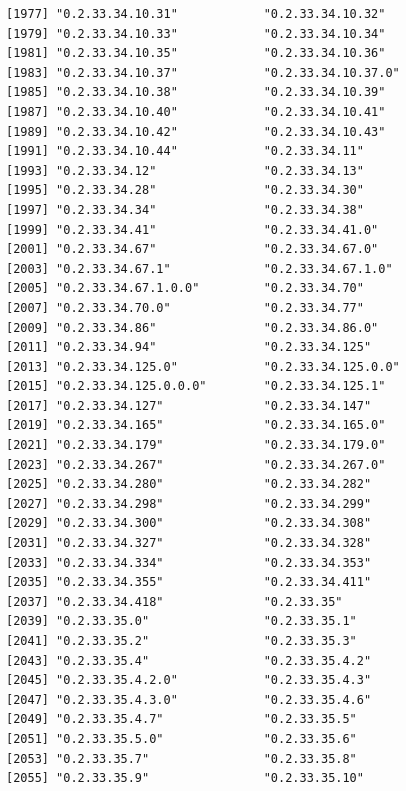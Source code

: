 \documentclass[
  letterpaper,
  DIV=11,
  numbers=noendperiod]{scrreprt}
\begin{document}
\begin{verbatim}
[1977] "0.2.33.34.10.31"            "0.2.33.34.10.32"           
[1979] "0.2.33.34.10.33"            "0.2.33.34.10.34"           
[1981] "0.2.33.34.10.35"            "0.2.33.34.10.36"           
[1983] "0.2.33.34.10.37"            "0.2.33.34.10.37.0"         
[1985] "0.2.33.34.10.38"            "0.2.33.34.10.39"           
[1987] "0.2.33.34.10.40"            "0.2.33.34.10.41"           
[1989] "0.2.33.34.10.42"            "0.2.33.34.10.43"           
[1991] "0.2.33.34.10.44"            "0.2.33.34.11"              
[1993] "0.2.33.34.12"               "0.2.33.34.13"              
[1995] "0.2.33.34.28"               "0.2.33.34.30"              
[1997] "0.2.33.34.34"               "0.2.33.34.38"              
[1999] "0.2.33.34.41"               "0.2.33.34.41.0"            
[2001] "0.2.33.34.67"               "0.2.33.34.67.0"            
[2003] "0.2.33.34.67.1"             "0.2.33.34.67.1.0"          
[2005] "0.2.33.34.67.1.0.0"         "0.2.33.34.70"              
[2007] "0.2.33.34.70.0"             "0.2.33.34.77"              
[2009] "0.2.33.34.86"               "0.2.33.34.86.0"            
[2011] "0.2.33.34.94"               "0.2.33.34.125"             
[2013] "0.2.33.34.125.0"            "0.2.33.34.125.0.0"         
[2015] "0.2.33.34.125.0.0.0"        "0.2.33.34.125.1"           
[2017] "0.2.33.34.127"              "0.2.33.34.147"             
[2019] "0.2.33.34.165"              "0.2.33.34.165.0"           
[2021] "0.2.33.34.179"              "0.2.33.34.179.0"           
[2023] "0.2.33.34.267"              "0.2.33.34.267.0"           
[2025] "0.2.33.34.280"              "0.2.33.34.282"             
[2027] "0.2.33.34.298"              "0.2.33.34.299"             
[2029] "0.2.33.34.300"              "0.2.33.34.308"             
[2031] "0.2.33.34.327"              "0.2.33.34.328"             
[2033] "0.2.33.34.334"              "0.2.33.34.353"             
[2035] "0.2.33.34.355"              "0.2.33.34.411"             
[2037] "0.2.33.34.418"              "0.2.33.35"                 
[2039] "0.2.33.35.0"                "0.2.33.35.1"               
[2041] "0.2.33.35.2"                "0.2.33.35.3"               
[2043] "0.2.33.35.4"                "0.2.33.35.4.2"             
[2045] "0.2.33.35.4.2.0"            "0.2.33.35.4.3"             
[2047] "0.2.33.35.4.3.0"            "0.2.33.35.4.6"             
[2049] "0.2.33.35.4.7"              "0.2.33.35.5"               
[2051] "0.2.33.35.5.0"              "0.2.33.35.6"               
[2053] "0.2.33.35.7"                "0.2.33.35.8"               
[2055] "0.2.33.35.9"                "0.2.33.35.10"              

\end{verbatim}
\end{document}
